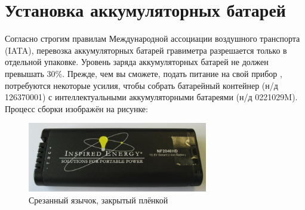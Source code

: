 \section{Установка аккумуляторных батарей}

Согласно строгим правилам Международной ассоциации воздушного транспорта (IATA),
перевозка аккумуляторных батарей гравиметра \cg{} разрешается только в отдельной
упаковке. Уровень заряда аккумуляторных батарей не должен превышать 30\%.
Прежде, чем вы сможете, подать питание на свой прибор \cg{}, потребуются некоторые
усилия, чтобы собрать батарейный контейнер (н/д 126370001) с интеллектуальными
аккумуляторными батареями (н/д 0221029M). Процесс сборки изображён на рисунке:


\begin{figure}[h]
  \centering
  \includegraphics[width=0.7\textwidth]{figures/removing_the_pull_tab_and_covering_with_tape}
  \caption{Срезанный язычок, закрытый плёнкой}
  \label{fig:removing_the_pull_tab_and_covering_with_tape}
\end{figure}


